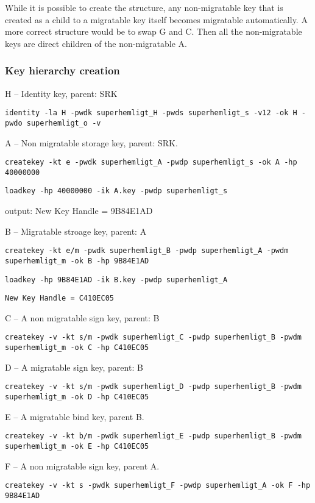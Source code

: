 \documentclass[10pt]{article}
\newcommand{\command}[1]{\texttt{#1}}
\begin{document}
    While it is possible to create the structure, any non-migratable key that
    is created as a child to a migratable key itself becomes migratable
    automatically.  A more correct structure would be to swap G and C.
    Then all the non-migratable keys are direct children of the non-migratable A.

    \subsubsection{Key hierarchy creation}

    H -- Identity key, parent: SRK

    \command{identity -la H -pwdk superhemligt\_H -pwds superhemligt\_s -v12 -ok H -pwdo superhemligt\_o -v}

    A -- Non migratable storage key, parent: SRK.

    \command{createkey -kt e -pwdk superhemligt\_A -pwdp superhemligt\_s -ok A
    -hp 40000000}

    \command{loadkey -hp 40000000 -ik A.key -pwdp superhemligt\_s}

    output: New Key Handle = 9B84E1AD

    B -- Migratable stroage key, parent: A

    \command{createkey -kt e/m -pwdk superhemligt\_B -pwdp superhemligt\_A
    -pwdm \\ superhemligt\_m -ok B -hp 9B84E1AD}

    \command{loadkey -hp 9B84E1AD -ik B.key -pwdp superhemligt\_A}

    \command{New Key Handle = C410EC05}

    C -- A non migratable sign key, parent: B

    \command{createkey -v -kt s/m -pwdk superhemligt\_C -pwdp superhemligt\_B
    -pwdm superhemligt\_m -ok C -hp C410EC05}

    D -- A migratable sign key, parent: B

    \command{createkey -v -kt s/m -pwdk superhemligt\_D -pwdp superhemligt\_B -pwdm superhemligt\_m -ok D -hp C410EC05}

    E -- A migratable bind key, parent B.

    \command{createkey -v -kt b/m -pwdk superhemligt\_E -pwdp superhemligt\_B -pwdm superhemligt\_m -ok E -hp C410EC05}

    F -- A non migratable sign key, parent A.

    \command{createkey -v -kt s -pwdk superhemligt\_F -pwdp superhemligt\_A -ok F -hp 9B84E1AD}
\end{document}
